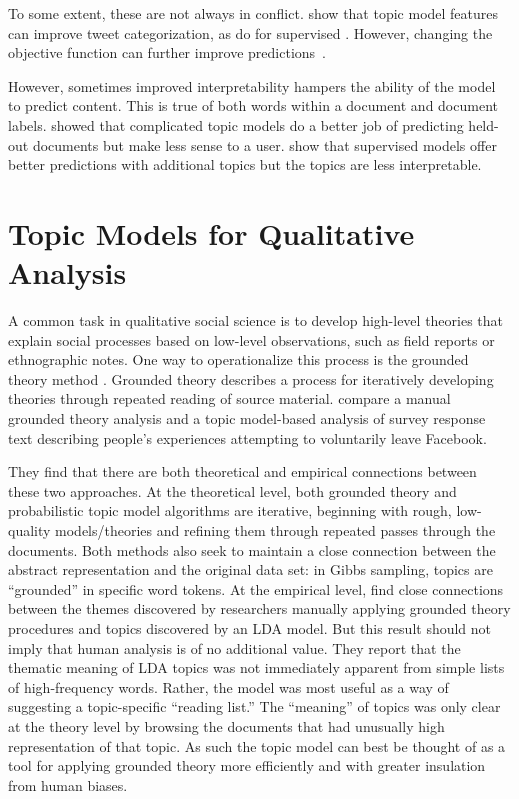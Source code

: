 To some extent, these are not always in conflict.  \citet{ramage-10b}
show that topic model features can improve tweet categorization, as
do \citet{blei-07b} for supervised .  However, changing the
objective function can further improve predictions~\citep{zhu-09}.

However, sometimes improved interpretability hampers the ability of
the model to predict content.  This is true of both words within a
document and document labels.  \citet{chang-09b} showed that
complicated topic models do a better job of predicting held-out
documents but make less sense to a user.  \citet{Nguyen-15:anchor}
show that supervised models offer better predictions with additional
topics but the topics are less interpretable.

\section{Topic Models for Qualitative Analysis}

A common task in qualitative social science is to develop high-level theories that explain social processes based on low-level observations, such as field reports or ethnographic notes.
One way to operationalize this process is the grounded theory method \cite{glaser-67}.
Grounded theory describes a process for iteratively developing theories through repeated reading of source material.
\citet{baumer-17} compare a manual grounded theory analysis and a topic model-based analysis of survey response text describing people's experiences attempting to voluntarily leave Facebook.

They find that there are both theoretical and empirical connections between these two approaches.
At the theoretical level, both grounded theory and probabilistic topic model algorithms are iterative, beginning with rough, low-quality models/theories and refining them through repeated passes through the documents.
Both methods also seek to maintain a close connection between the abstract representation and the original data set: in Gibbs sampling, topics are ``grounded'' in specific word tokens.
At the empirical level, \citet{baumer-17} find close connections between the themes discovered by researchers manually applying grounded theory procedures and topics discovered by an LDA model.
But this result should not imply that human analysis is of no additional value.
They report that the thematic meaning of LDA topics was not immediately apparent from simple lists of high-frequency words.
Rather, the model was most useful as a way of suggesting a topic-specific ``reading list.''
The ``meaning'' of topics was only clear at the theory level by browsing the documents that had unusually high representation of that topic.
As such the topic model can best be thought of as a tool for applying grounded theory more efficiently and with greater insulation from human biases. 

